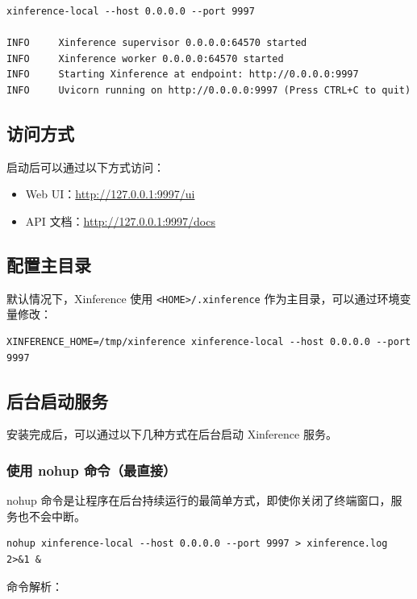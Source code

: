 \documentclass[12pt,UTF8]{ctexbook}
\begin{document}
\begin{lstlisting}
xinference-local --host 0.0.0.0 --port 9997

INFO     Xinference supervisor 0.0.0.0:64570 started
INFO     Xinference worker 0.0.0.0:64570 started
INFO     Starting Xinference at endpoint: http://0.0.0.0:9997
INFO     Uvicorn running on http://0.0.0.0:9997 (Press CTRL+C to quit)
\end{lstlisting}

\subsection{访问方式}

启动后可以通过以下方式访问：
\begin{itemize}[leftmargin=2cm]
    \item Web UI：\url{http://127.0.0.1:9997/ui}
    \item API 文档：\url{http://127.0.0.1:9997/docs}
\end{itemize}

\subsection{配置主目录}

默认情况下，Xinference 使用 \texttt{<HOME>/.xinference} 作为主目录，可以通过环境变量修改：

\begin{lstlisting}
XINFERENCE_HOME=/tmp/xinference xinference-local --host 0.0.0.0 --port 9997
\end{lstlisting}

\subsection{后台启动服务}

安装完成后，可以通过以下几种方式在后台启动 Xinference 服务。

\subsubsection{使用 nohup 命令（最直接）}

nohup 命令是让程序在后台持续运行的最简单方式，即使你关闭了终端窗口，服务也不会中断。

\begin{lstlisting}
nohup xinference-local --host 0.0.0.0 --port 9997 > xinference.log 2>&1 &
\end{lstlisting}

命令解析：
\end{document}
